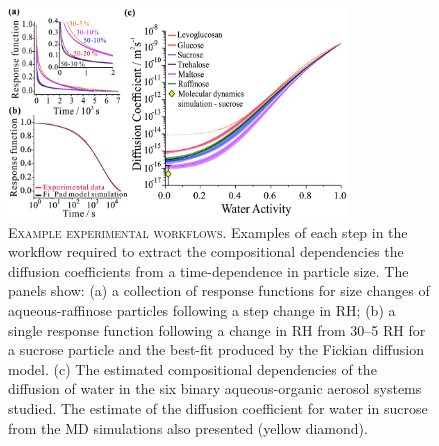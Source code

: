 \begin{figure}
    \centering
    \includegraphics[width=0.8\textwidth]{chapters/water_hopping/figures/f1.png}
    \caption[Example experimental workflows]{\textsc{Example experimental workflows}. Examples of each step in the workflow required to extract the compositional dependencies the diffusion coefficients from a time-dependence in particle size. The panels show: (a) a collection of response functions for size changes of aqueous-raffinose particles following a step change in RH; (b) a single response function following a change in RH from \numrange{30}{5} RH for a sucrose particle and the best-fit produced by the Fickian diffusion model. (c) The estimated compositional dependencies of the diffusion of water in the six binary aqueous-organic aerosol systems studied. The estimate of the diffusion coefficient for water in sucrose from the MD simulations also presented (yellow diamond).}
    \label{fig:wat_f1}
\end{figure}

